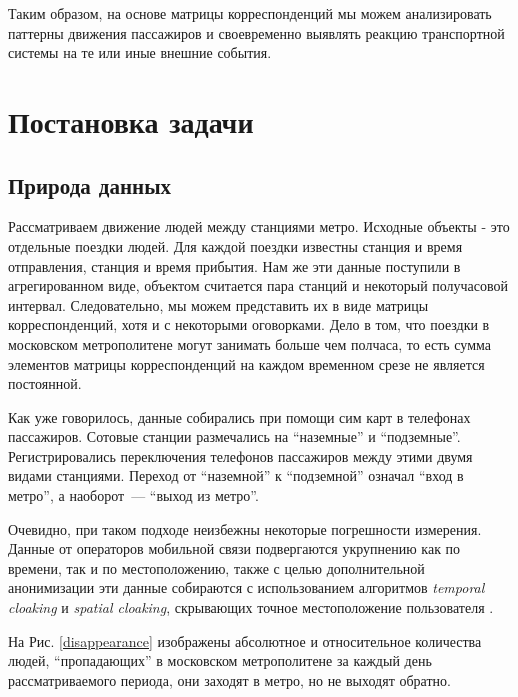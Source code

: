 \documentclass[12pt, fleqn, titlepage]{article}
\begin{document}
    Таким образом, на основе матрицы корреспонденций мы можем анализировать паттерны движения пассажиров и своевременно выявлять 
    реакцию транспортной системы на те или иные внешние события.

    \section{Постановка задачи}

    \subsection{Природа данных}

    Рассматриваем движение людей между станциями метро. Исходные объекты - это отдельные поездки людей. 
    Для каждой поездки известны станция и время отправления, станция и время прибытия. Нам же эти данные 
    поступили в агрегированном виде, объектом считается пара станций и некоторый получасовой интервал. 
    Следовательно, мы можем представить их в виде матрицы корреспонденций, хотя и с некоторыми оговорками. 
    Дело в том, что поездки в московском метрополитене могут занимать больше чем полчаса, то есть сумма 
    элементов матрицы корреспонденций на каждом временном срезе не является постоянной.

    Как уже говорилось, данные собирались при помощи сим карт в телефонах пассажиров. Сотовые станции размечались на 
    “наземные” и “подземные”. Регистрировались переключения телефонов пассажиров между этими двумя видами станциями. 
    Переход от “наземной” к “подземной” означал “вход в метро”, а наоборот~--- “выход из метро”. 

    Очевидно, при таком подходе неизбежны некоторые погрешности измерения. 
    Данные от операторов мобильной связи подвергаются укрупнению как по времени, так и по местоположению, также 
    с целью дополнительной анонимизации эти данные собираются с использованием алгоритмов \textit{temporal cloaking} и 
    \textit{spatial cloaking}, скрывающих точное местоположение пользователя \cite{niu2015novel}.

    На Рис. \ref{disappearance} изображены абсолютное и относительное количества людей, “пропадающих” в московском 
    метрополитене за каждый день рассматриваемого периода, они заходят в метро, но не выходят обратно. 
\end{document}
